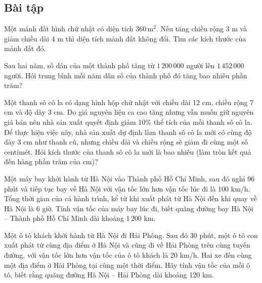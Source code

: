 \begin{exercises}
    \subsection{Bài tập}

    \begin{questions}[resume=SGK]
        \item Một mảnh đất hình chữ nhật có diện tích $360\,\text{m}^2$. Nếu tăng chiều rộng 3 m và giảm chiều dài 4 m thì diện tích mảnh đất không đổi. Tìm các kích thước của mảnh đất đó.

        \answerline
        \answerline
        \answerline

        \item Sau hai năm, số dân của một thành phố tăng từ $1\,200\,000$ người lên $1\,452\,000$ người. Hỏi trung bình mỗi năm dân số của thành phố đó tăng bao nhiêu phần trăm?

        \answerline
        \answerline
        \answerline

        \item Một thanh sô cô la có dạng hình hộp chữ nhật với chiều dài 12 cm, chiều rộng 7 cm và độ dày 3 cm. Do giá nguyên liệu ca cao tăng nhưng vẫn muốn giữ nguyên giá bán nên nhà sản xuất quyết định giảm 10\% thể tích của mỗi thanh sô cô la. Để thực hiện việc này, nhà sản xuất dự định làm thanh sô cô la mới có cùng độ dày 3 cm như thanh cũ, nhưng chiều dài và chiều rộng sẽ giảm đi cùng một số centimét. Hỏi kích thước của thanh sô cô la mới là bao nhiêu (làm tròn kết quả đến hàng phần trăm của cm)?

        \answerline
        \answerline
        \answerline

        \item Một máy bay khởi hành từ Hà Nội vào Thành phố Hồ Chí Minh, sau đó nghỉ 96 phút và tiếp tục bay về Hà Nội với vận tốc lớn hơn vận tốc lúc đi là 100 km/h. Tổng thời gian của cả hành trình, kể từ khi xuất phát từ Hà Nội đến khi quay về Hà Nội là 6 giờ. Tính vận tốc của máy bay lúc đi, biết quãng đường bay Hà Nội – Thành phố Hồ Chí Minh dài khoảng $1\,200$ km.

        \answerline
        \answerline
        \answerline

        \item Một ô tô khách khởi hành từ Hà Nội đi Hải Phòng. Sau đó 30 phút, một ô tô con xuất phát từ cùng địa điểm ở Hà Nội và cũng đi về Hải Phòng trên cùng tuyến đường, với vận tốc lớn hơn vận tốc của ô tô khách là 20 km/h. Hai xe đến cùng một địa điểm ở Hải Phòng tại cùng một thời điểm. Hãy tính vận tốc của mỗi ô tô, biết rằng quãng đường Hà Nội – Hải Phòng dài khoảng 120 km.


\end{questions}
\end{exercises}
